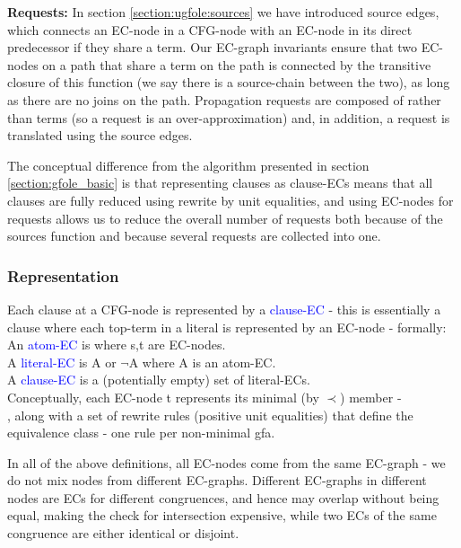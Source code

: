 \textbf{Requests:} In section \ref{section:ugfole:sources} we have introduced source edges, which connects an EC-node in a CFG-node with an EC-node in its direct predecessor if they share a term. Our EC-graph invariants ensure that two EC-nodes on a path that share a term on the path is connected by the transitive closure of this function (we say there is a source-chain between the two), as long as there are no joins on the path. Propagation requests are composed of \GFAs{} rather than terms (so a request is an over-approximation) and, in addition, a request is translated using the source edges.

\bigskip

The conceptual difference from the algorithm presented in section \ref{section:gfole_basic} is that representing clauses as clause-ECs means that all clauses are fully reduced using rewrite by unit equalities, and using EC-nodes for requests allows us to reduce the overall number of requests both because of the sources function and because several requests are collected into one.

\subsubsection*{Representation}
Each clause at a CFG-node is represented by a \textcolor{blue}{clause-EC} - this is essentially a clause where each top-term in a literal is represented by an EC-node - formally:\\
An \textcolor{blue}{atom-EC} is  where s,t are EC-nodes.\\
A \textcolor{blue}{literal-EC} is A or $\lnot$A where A is an atom-EC.\\
A \textcolor{blue}{clause-EC} is a (potentially empty) set of literal-ECs.\\
Conceptually, each EC-node t represents its minimal (by $\prec$) member	- \\
, 
along with a set of rewrite rules (positive unit equalities) that define the equivalence class - one rule per non-minimal gfa.

In all of the above definitions, all EC-nodes come from the same EC-graph - we do not mix nodes from different EC-graphs.
Different EC-graphs in different nodes are ECs for different congruences, and hence may overlap without being equal, making the check for intersection expensive, while two ECs of the same congruence are either identical or disjoint.

